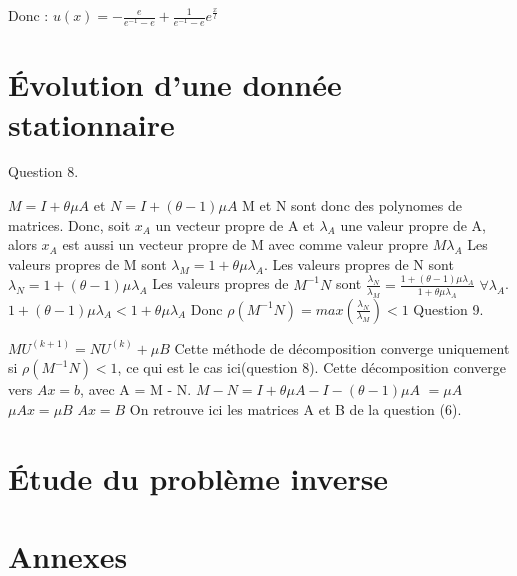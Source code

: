 \documentclass[a4paper,11pt]{article}
\theoremstyle{nonumberplain}
\begin{document}
Donc :
$u(x) = -\frac{e}{e^{-1} - e} + \frac{1}{e^{-1} - e} e^{\frac{x}{l}} $

\section{\'{E}volution d'une donnée stationnaire}

Question 8.
\newline

$M = I+ \theta \mu A$ et $N = I+(\theta - 1)\mu A$
\newline
M et N sont donc des polynomes de matrices.
\newline
Donc, soit $x_A$ un vecteur propre de A et $\lambda_A$ une valeur propre de A,
alors $x_A$ est aussi un vecteur propre de M avec comme valeur propre $M\lambda_A$
\newline
Les valeurs propres de M sont $\lambda_M = 1+\theta \mu \lambda_A$.
\newline
Les valeurs propres de N sont $\lambda_N = 1+(\theta - 1)\mu \lambda_A$
\newline
Les valeurs propres de $M^{-1}N$ sont $\frac{\lambda_N}{\lambda_M} = \frac{1+(\theta - 1)\mu \lambda_A}{1+\theta \mu \lambda_A}$ $\forall \lambda_A$.
$ 1+(\theta - 1)\mu \lambda_A < 1+\theta \mu \lambda_A$
\newline
Donc $\rho(M^{-1}N) = max(\frac{\lambda_N}{\lambda_M}) < 1$
\newline
\newline
Question 9.

$M U^{(k+1)} = NU^{(k)} + \mu B$
Cette méthode de décomposition converge uniquement si $\rho(M^{-1}N) < 1$, ce qui est le cas ici(question 8).
\newline
Cette décomposition converge vers $Ax = b$, avec A = M - N.
\newline
$M - N = I + \theta \mu A - I - (\theta - 1) \mu A$
$ = \mu A $
\newline
$\mu A x = \mu B$
$A x = B$
On retrouve ici les matrices A et B de la question (6).
\section{\'{E}tude du problème inverse}

\section*{Annexes}

\vspace{8cm}
\end{document}
